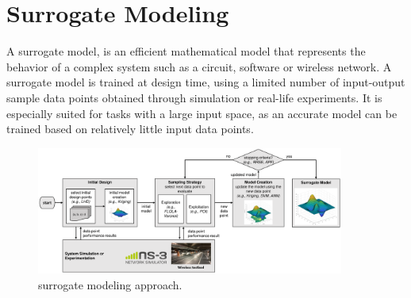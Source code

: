\section{Surrogate Modeling \label{sec:SUMO}}

 A surrogate model, is an efficient mathematical model that represents the behavior of a complex system such as a circuit, software or wireless network. A surrogate model is trained at design time, using a limited number of input-output sample data points obtained through simulation or real-life experiments. It is especially suited for tasks with a large input space, as an accurate model can be trained based on relatively little input data points.
 
\begin{figure}[t]
  \centering
  \includegraphics[width=0.9\textwidth]{figures/surrogate_modeling_approach}  \caption{surrogate modeling approach. \label{fig:surrogate_modeling}}
\end{figure}







